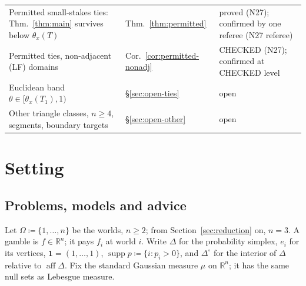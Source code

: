 \documentclass[11pt]{article}
\theoremstyle{definition}
\theoremstyle{remark}
\newcommand{\R}{\mathbb R}
\newcommand{\one}{\mathbf 1}
\newcommand{\Di}{\Delta^{\circ}}
\newcommand{\supp}{\operatorname{supp}}
\newcommand{\aff}{\operatorname{aff}}
\begin{document}
{\begin{longtable}{>{\raggedright\arraybackslash}p{6.4cm}>{\raggedright\arraybackslash}p{2.1cm}>{\raggedright\arraybackslash}p{5.6cm}}
Permitted small-stakes ties: Thm.~\ref{thm:main} survives below $\theta_x(T)$ & Thm.~\ref{thm:permitted} & proved (N27); confirmed by one referee (N27 referee)\\
Permitted ties, non-adjacent (LF) domains & Cor.~\ref{cor:permitted-nonadj} & CHECKED (N27); confirmed at CHECKED level\\
Euclidean band $\theta\in[\theta_x(T_1),1)$ & \S\ref{sec:open-ties} & open\\
Other triangle classes, $n\ge4$, segments, boundary targets & \S\ref{sec:open-other} & open\\
\bottomrule
\end{longtable}}

\section{Setting}\label{sec:setting}

\subsection{Problems, models and advice}
Let $\Omega\coloneqq\{1,\dots,n\}$ be the worlds, $n\ge2$; from Section~\ref{sec:reduction} on, $n=3$. A gamble is $f\in\R^n$; it pays $f_i$ at world $i$. Write $\Delta$ for the probability simplex, $e_i$ for its vertices, $\one=(1,\dots,1)$, $\supp p\coloneqq\{i:p_i>0\}$, and $\Di$ for the interior of $\Delta$ relative to $\aff\Delta$. Fix the standard Gaussian measure $\mu$ on $\R^n$; it has the same null sets as Lebesgue measure.
\end{document}
